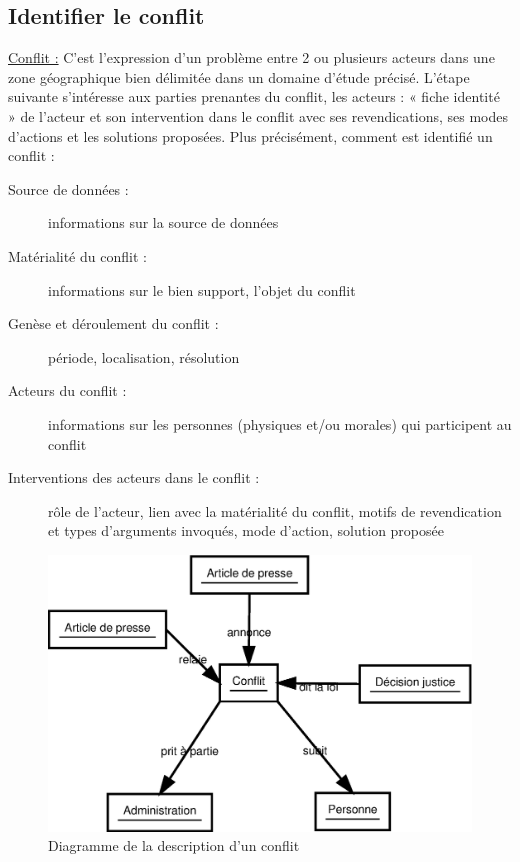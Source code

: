 \documentclass[12pt,a4paper]{article}
\begin{document}
\subsection{Identifier le conflit}
\underline{Conflit :} C'est l'expression d'un problème entre 2 ou plusieurs acteurs dans une zone géographique bien délimitée dans un domaine d'étude précisé. L’étape suivante s'intéresse aux parties prenantes du conflit, les acteurs : « fiche identité » de l’acteur et son intervention dans le conflit avec ses revendications, ses modes d’actions et les solutions proposées. \newline 
Plus précisément, comment est identifié un conflit :
\begin{description}
\item[Source de données :] informations sur la source de données
\item[Matérialité du conflit :] informations sur le bien support, l’objet du conflit
\item[Genèse et déroulement du conflit :] période, localisation, résolution 
\item[Acteurs du conflit :] informations sur les personnes (physiques et/ou morales) qui participent au conflit
\item[Interventions des acteurs dans le conflit :] rôle de l’acteur, lien avec la matérialité du conflit, motifs de revendication et types d’arguments invoqués, mode d’action, solution proposée \newline \newline
\end{description}

\begin{figure}[!ht]
\centering
\includegraphics[scale=0.4]{Image/ExplicationConflit.eps}
\caption{Diagramme de la description d'un conflit}
\end{figure}
\end{document}
